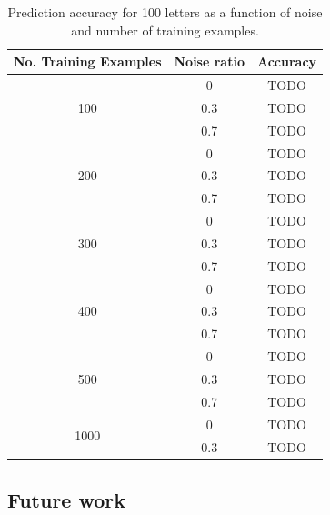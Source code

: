 \documentclass[a4paper,12pt]{article}
\begin{document}
\begin{table}
\centering\begin{tabular}{|c|c|c|} \hline

	No. Training Examples & Noise ratio & Accuracy \\ \hline
	\multirow{3}{*}{100}  &	0	&	TODO \\ \cline{2-3}
		& 0.3	& TODO \\ \cline{2-3}
		& 0.7	& TODO \\ \hline
	\multirow{3}{*}{200}  & 0	& TODO \\ \cline{2-3}
		& 0.3	& TODO \\ \cline{2-3}
		& 0.7	& TODO \\ \hline
	\multirow{3}{*}{300}  & 0	& TODO \\ \cline{2-3}
		& 0.3	& TODO \\ \cline{2-3}
		& 0.7	& TODO \\ \hline
	\multirow{3}{*}{400}  & 0	& TODO \\ \cline{2-3}
		& 0.3	& TODO \\ \cline{2-3}
		& 0.7	& TODO \\ \hline
	\multirow{3}{*}{500}  & 0	& TODO \\ \cline{2-3}
		& 0.3	& TODO \\ \cline{2-3}
		& 0.7	& TODO \\ \hline
	\multirow{2}{*}{1000}  & 0	& TODO \\ \cline{2-3}
		& 0.3	& TODO \\ \hline

\end{tabular}
\caption{Prediction accuracy for 100 letters as a function of noise and number
of training examples.}
\label{tab:results-accuracy}
\end{table}

\subsection*{Future work}

\vskip 0.2in


\end{document}
